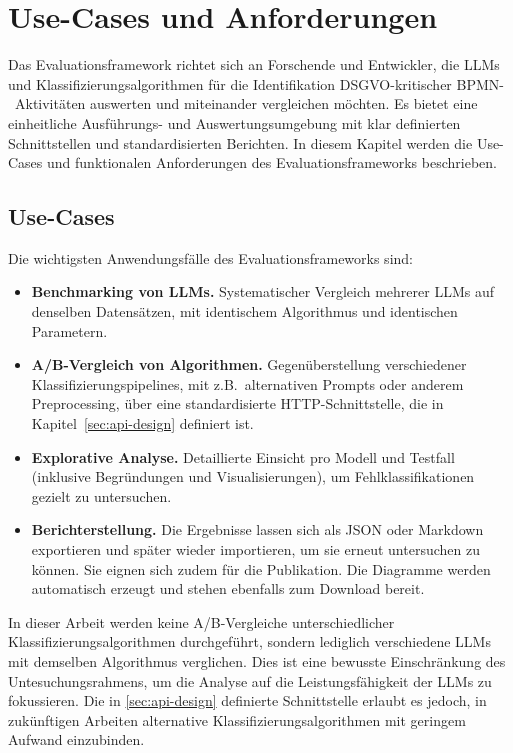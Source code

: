 \section{Use-Cases und Anforderungen}\label{sec:anforderungen-und-use-cases}

Das Evaluationsframework richtet sich an Forschende und Entwickler, die \acp{LLM} und Klassifizierungsalgorithmen für die Identifikation \ac{DSGVO}-kritischer \ac{BPMN}-\linebreak~Aktivitäten auswerten und miteinander vergleichen möchten. Es bietet eine einheitliche Ausführungs- und Auswertungsumgebung mit klar definierten Schnittstellen und standardisierten Berichten. In diesem Kapitel werden die Use-Cases und funktionalen Anforderungen des Evaluationsframeworks beschrieben.

\subsection*{Use-Cases}

Die wichtigsten Anwendungsfälle des Evaluationsframeworks sind:

\begin{itemize}
    \item \textbf{Benchmarking von \acp{LLM}.} Systematischer Vergleich mehrerer \acp{LLM} auf denselben Datensätzen, mit identischem Algorithmus und identischen Parametern.
    \item \textbf{A/B-Vergleich von Algorithmen.} Gegenüberstellung verschiedener Klassifizierungspipelines, mit z.B.\ alternativen Prompts oder anderem Preprocessing, über eine standardisierte HTTP-Schnittstelle, die in Kapitel~\ref{sec:api-design} definiert ist.
    \item \textbf{Explorative Analyse.} Detaillierte Einsicht pro Modell und Testfall (inklusive Begründungen und Visualisierungen), um Fehlklassifikationen gezielt zu untersuchen.
    \item \textbf{Berichterstellung.} Die Ergebnisse lassen sich als JSON oder Markdown exportieren und später wieder importieren, um sie erneut untersuchen zu können. Sie eignen sich zudem für die Publikation. Die Diagramme werden automatisch erzeugt und stehen ebenfalls zum Download bereit.
\end{itemize}

In dieser Arbeit werden keine A/B-Vergleiche unterschiedlicher Klassifizierungsalgorithmen durchgeführt, sondern lediglich verschiedene \acp{LLM} mit demselben Algorithmus verglichen. Dies ist eine bewusste Einschränkung des Untesuchungsrahmens, um die Analyse auf die Leistungsfähigkeit der \acp{LLM} zu fokussieren. Die in \ref{sec:api-design} definierte Schnittstelle erlaubt es jedoch, in zukünftigen Arbeiten alternative Klassifizierungsalgorithmen mit geringem Aufwand einzubinden.

